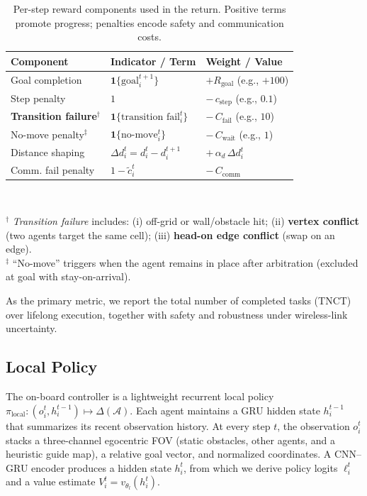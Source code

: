 \documentclass[conference]{IEEEtran}
\begin{document}
\begin{table}[!t]
  \centering
  \caption{Per-step reward components used in the return. Positive terms promote progress; penalties encode safety and communication costs.}
  \label{tab:reward-return}
  \renewcommand{\arraystretch}{1.12}\setlength{\tabcolsep}{6pt}
  \begin{tabular}{l l l}
    \hline
    \textbf{Component} & \textbf{Indicator / Term} & \textbf{Weight / Value} \\
    \hline
    Goal completion & $\mathbf{1}\{\text{goal}_i^{t+1}\}$ & $+R_{\text{goal}}$ (e.g., $+100$) \\
    Step penalty & $1$ & $-\,c_{\text{step}}$ (e.g., $0.1$) \\
    \textbf{Transition failure}$^\dagger$ & $\mathbf{1}\{\text{transition fail}_i^t\}$ & $-\,C_{\text{fail}}$ (e.g., $10$) \\
    No-move penalty$^\ddagger$ & $\mathbf{1}\{\text{no-move}_i^t\}$ & $-\,C_{\text{wait}}$ (e.g., $1$) \\
    Distance shaping & $\Delta d_i^t=d_i^t-d_i^{t+1}$ & $+\,\alpha_d\,\Delta d_i^t$ \\
    Comm. fail penalty & $1-\tilde c_i^t$ & $-\,C_{\text{comm}}$ \\
    \hline
  \end{tabular}
  \\[2pt]
  \raggedright\footnotesize
  $^\dagger$ \emph{Transition failure} includes: (i) off-grid or wall/obstacle hit; (ii) \textbf{vertex conflict} (two agents target the same cell); (iii) \textbf{head-on edge conflict} (swap on an edge). \\
  $^\ddagger$ ``No-move'' triggers when the agent remains in place after arbitration (excluded at goal with stay-on-arrival).
\end{table}

As the primary metric, we report the total number of completed tasks (TNCT) over lifelong execution, together with safety and robustness under wireless-link uncertainty.







\subsection{Local Policy}

The on-board controller is a lightweight recurrent local policy
$\pi_{\text{local}} : (o_i^t, h_i^{t-1}) \!\mapsto\! \Delta(\mathcal A)$.
Each agent maintains a GRU hidden state $h_i^{t-1}$ that summarizes its recent
observation history. At every step $t$, the observation $o_i^t$ stacks a
three-channel egocentric FOV (static obstacles, other agents, and a heuristic
guide map), a relative goal vector, and normalized coordinates.
A CNN--GRU encoder produces a hidden state $h_i^t$, from which we derive
policy logits $\ell_i^t$ and a value estimate $V_i^t = v_{\theta_l}(h_i^t)$.
\end{document}
